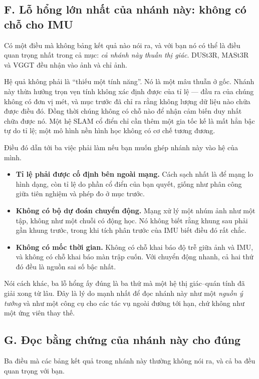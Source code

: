 \documentclass[../../deep_learning.tex]{subfiles}
\begin{document}
\subsection{F. Lỗ hổng lớn nhất của nhánh này: không có chỗ cho IMU}
Có một điều mà không bảng kết quả nào nói ra, và với bạn nó có thể là điều quan trọng nhất trong cả mục: \emph{cả nhánh này thuần thị giác}. DUSt3R, MASt3R và VGGT đều nhận vào ảnh và chỉ ảnh.

Hệ quả không phải là ``thiếu một tính năng''. Nó là một mâu thuẫn ở gốc. Nhánh này thừa hưởng trọn vẹn tính không xác định được của tỉ lệ --- đầu ra của chúng không có đơn vị mét, và mục trước đã chỉ ra rằng không lượng dữ liệu nào chữa được điều đó. Đồng thời chúng không có chỗ nào để nhận cảm biến duy nhất chữa được nó. Một hệ SLAM cổ điển chỉ cần thêm một gia tốc kế là mất hẳn bậc tự do tỉ lệ; một mô hình nền hình học không có cơ chế tương đương.

Điều đó dẫn tới ba việc phải làm nếu bạn muốn ghép nhánh này vào hệ của mình.
\begin{itemize}
\item \textbf{Tỉ lệ phải được cố định bên ngoài mạng.} Cách sạch nhất là để mạng lo hình dạng, còn tỉ lệ do phần cổ điển của bạn quyết, giống như phân công giữa tiên nghiệm và phép đo ở mục trước.
\item \textbf{Không có bộ dự đoán chuyển động.} Mạng xử lý một nhúm ảnh như một tập, không như một chuỗi có động học. Nó không biết rằng khung sau phải gần khung trước, trong khi tích phân trước của IMU biết điều đó rất chắc.
\item \textbf{Không có mốc thời gian.} Không có chỗ khai báo độ trễ giữa ảnh và IMU, và không có chỗ khai báo màn trập cuốn. Với chuyển động nhanh, cả hai thứ đó đều là nguồn sai số bậc nhất.
\end{itemize}

Nói cách khác, ba lỗ hổng ấy đúng là ba thứ mà một hệ thị giác--quán tính đã giải xong từ lâu. Đây là lý do mạnh nhất để đọc nhánh này như một \emph{nguồn ý tưởng} và như một công cụ cho các tác vụ ngoài đường tới hạn, chứ không như một ứng viên thay thế.

\subsection{G. Đọc bằng chứng của nhánh này cho đúng}
Ba điều mà các bảng kết quả trong nhánh này thường không nói ra, và cả ba đều quan trọng với bạn.
\end{document}
